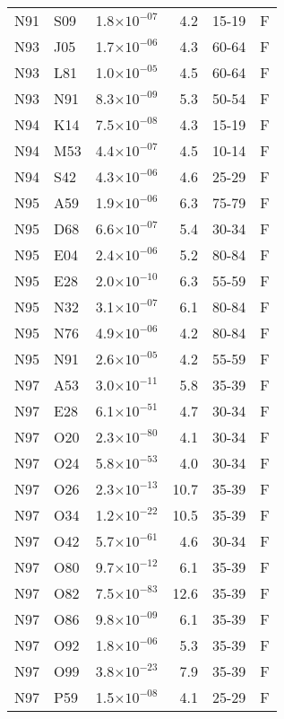 \begin{longtable}{lllrll}
   N91 & S09 & 1.8$\times10^{-07}$ & 4.2 & 15-19 & F \\ 
   N93 & J05 & 1.7$\times10^{-06}$ & 4.3 & 60-64 & F \\ 
   N93 & L81 & 1.0$\times10^{-05}$ & 4.5 & 60-64 & F \\ 
   N93 & N91 & 8.3$\times10^{-09}$ & 5.3 & 50-54 & F \\ 
   N94 & K14 & 7.5$\times10^{-08}$ & 4.3 & 15-19 & F \\ 
   N94 & M53 & 4.4$\times10^{-07}$ & 4.5 & 10-14 & F \\ 
   N94 & S42 & 4.3$\times10^{-06}$ & 4.6 & 25-29 & F \\ 
   N95 & A59 & 1.9$\times10^{-06}$ & 6.3 & 75-79 & F \\ 
   N95 & D68 & 6.6$\times10^{-07}$ & 5.4 & 30-34 & F \\ 
   N95 & E04 & 2.4$\times10^{-06}$ & 5.2 & 80-84 & F \\ 
   N95 & E28 & 2.0$\times10^{-10}$ & 6.3 & 55-59 & F \\ 
   N95 & N32 & 3.1$\times10^{-07}$ & 6.1 & 80-84 & F \\ 
   N95 & N76 & 4.9$\times10^{-06}$ & 4.2 & 80-84 & F \\ 
   N95 & N91 & 2.6$\times10^{-05}$ & 4.2 & 55-59 & F \\ 
   N97 & A53 & 3.0$\times10^{-11}$ & 5.8 & 35-39 & F \\ 
   N97 & E28 & 6.1$\times10^{-51}$ & 4.7 & 30-34 & F \\ 
   N97 & O20 & 2.3$\times10^{-80}$ & 4.1 & 30-34 & F \\ 
   N97 & O24 & 5.8$\times10^{-53}$ & 4.0 & 30-34 & F \\ 
   N97 & O26 & 2.3$\times10^{-13}$ & 10.7 & 35-39 & F \\ 
   N97 & O34 & 1.2$\times10^{-22}$ & 10.5 & 35-39 & F \\ 
   N97 & O42 & 5.7$\times10^{-61}$ & 4.6 & 30-34 & F \\ 
   N97 & O80 & 9.7$\times10^{-12}$ & 6.1 & 35-39 & F \\ 
   N97 & O82 & 7.5$\times10^{-83}$ & 12.6 & 35-39 & F \\ 
   N97 & O86 & 9.8$\times10^{-09}$ & 6.1 & 35-39 & F \\ 
   N97 & O92 & 1.8$\times10^{-06}$ & 5.3 & 35-39 & F \\ 
   N97 & O99 & 3.8$\times10^{-23}$ & 7.9 & 35-39 & F \\ 
   N97 & P59 & 1.5$\times10^{-08}$ & 4.1 & 25-29 & F \\ 

\end{longtable}
